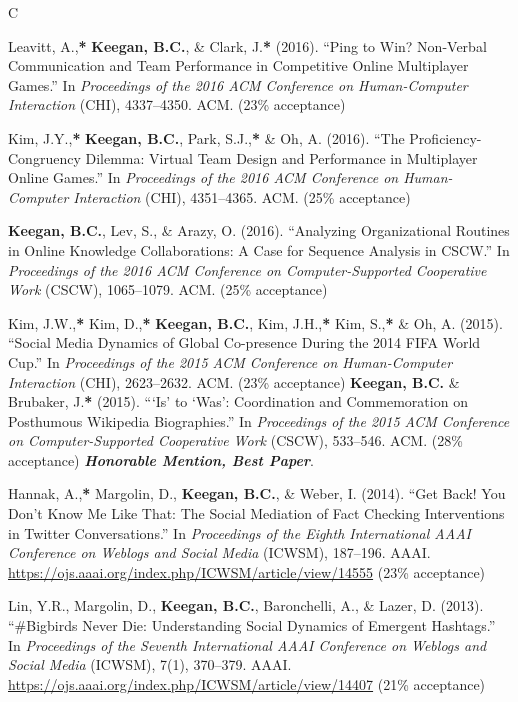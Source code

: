 \documentclass{cv}
\begin{document}
\begin{entries}{C}
		\item Leavitt, A.,\textbf{*} \textbf{Keegan, B.C.}, \& Clark, J.\textbf{*} (2016). ``Ping to Win? Non-Verbal Communication and Team Performance in Competitive Online Multiplayer Games.'' In \textit{Proceedings of the 2016 ACM Conference on Human-Computer Interaction} (CHI), 4337--4350. ACM.  (23\% acceptance)
		\item Kim, J.Y.,\textbf{*} \textbf{Keegan, B.C.}, Park, S.J.,\textbf{*} \& Oh, A. (2016). ``The Proficiency-Congruency Dilemma: Virtual Team Design and Performance in Multiplayer Online Games.'' In \textit{Proceedings of the 2016 ACM Conference on Human-Computer Interaction} (CHI), 4351--4365. ACM.  (25\% acceptance)
		\item \textbf{Keegan, B.C.}, Lev, S., \& Arazy, O. (2016). ``Analyzing Organizational Routines in Online Knowledge Collaborations: A Case for Sequence Analysis in CSCW.'' In \textit{Proceedings of the 2016 ACM Conference on Computer-Supported Cooperative Work} (CSCW), 1065--1079. ACM.  (25\% acceptance)
		\item Kim, J.W.,\textbf{*} Kim, D.,\textbf{*} \textbf{Keegan, B.C.}, Kim, J.H.,\textbf{*} Kim, S.,\textbf{*} \& Oh, A. (2015). ``Social Media Dynamics of Global Co-presence During the 2014 FIFA World Cup.'' In \textit{Proceedings of the 2015 ACM Conference on Human-Computer Interaction} (CHI), 2623--2632. ACM.  (23\% acceptance)
		\awarditem \textbf{Keegan, B.C.} \& Brubaker, J.\textbf{*} (2015). ```Is' to `Was': Coordination and Commemoration on Posthumous Wikipedia Biographies.'' In \textit{Proceedings of the 2015 ACM Conference on Computer-Supported Cooperative Work} (CSCW), 533--546. ACM.  (28\% acceptance) \textbf{\textit{Honorable Mention, Best Paper}}.
		\item Hannak, A.,\textbf{*} Margolin, D., \textbf{Keegan, B.C.}, \& Weber, I. (2014). ``Get Back! You Don't Know Me Like That: The Social Mediation of Fact Checking Interventions in Twitter Conversations.'' In \textit{Proceedings of the Eighth International AAAI Conference on Weblogs and Social Media} (ICWSM), 187--196. AAAI. \url{https://ojs.aaai.org/index.php/ICWSM/article/view/14555} (23\% acceptance)
		\item Lin, Y.R., Margolin, D., \textbf{Keegan, B.C.}, Baronchelli, A., \& Lazer, D. (2013). ``\#Bigbirds Never Die: Understanding Social Dynamics of Emergent Hashtags.'' In \textit{Proceedings of the Seventh International AAAI Conference on Weblogs and Social Media} (ICWSM), 7(1), 370--379. AAAI. \url{https://ojs.aaai.org/index.php/ICWSM/article/view/14407} (21\% acceptance)

\end{entries}
\end{document}

